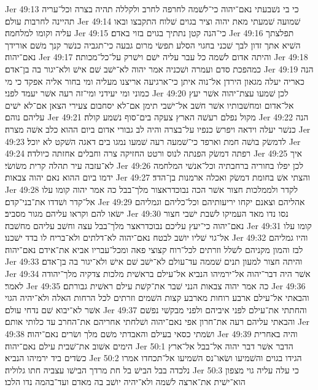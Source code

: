 Jer 49:13  כי בי נשׁבעתי נאם־יהוה כי־לשׁמה לחרפה לחרב ולקללה תהיה בצרה וכל־עריה תהיינה לחרבות עולם׃
Jer 49:14  שׁמועה שׁמעתי מאת יהוה וציר בגוים שׁלוח התקבצו ובאו עליה וקומו למלחמה׃
Jer 49:15  כי־הנה קטן נתתיך בגוים בזוי באדם׃
Jer 49:16  תפלצתך השׁיא אתך זדון לבך שׁכני בחגוי הסלע תפשׂי מרום גבעה כי־תגביה כנשׁר קנך משׁם אורידך נאם־יהוה׃
Jer 49:17  והיתה אדום לשׁמה כל עבר עליה ישׁם וישׁרק על־כל־מכותה׃
Jer 49:18  כמהפכת סדם ועמרה ושׁכניה אמר יהוה לא־ישׁב שׁם אישׁ ולא־יגור בה בן־אדם׃
Jer 49:19  הנה כאריה יעלה מגאון הירדן אל־נוה איתן כי־ארגיעה אריצנו מעליה ומי בחור אליה אפקד כי מי כמוני ומי יעידני ומי־זה רעה אשׁר יעמד לפני׃
Jer 49:20  לכן שׁמעו עצת־יהוה אשׁר יעץ אל־אדום ומחשׁבותיו אשׁר חשׁב אל־ישׁבי תימן אם־לא יסחבום צעירי הצאן אם־לא ישׁים עליהם נוהם׃
Jer 49:21  מקול נפלם רעשׁה הארץ צעקה בים־סוף נשׁמע קולה׃
Jer 49:22  הנה כנשׁר יעלה וידאה ויפרשׂ כנפיו על־בצרה והיה לב גבורי אדום ביום ההוא כלב אשׁה מצרה׃
Jer 49:23  לדמשׂק בושׁה חמת וארפד כי־שׁמעה רעה שׁמעו נמגו בים דאגה השׁקט לא יוכל׃
Jer 49:24  רפתה דמשׂק הפנתה לנוס ורטט החזיקה צרה וחבלים אחזתה כיולדה׃
Jer 49:25  איך לא־עזבה עיר תהלה קרית משׂושׂי׃
Jer 49:26  לכן יפלו בחוריה ברחבתיה וכל־אנשׁי המלחמה ידמו ביום ההוא נאם יהוה צבאות׃
Jer 49:27  והצתי אשׁ בחומת דמשׂק ואכלה ארמנות בן־הדד׃
Jer 49:28  לקדר ולממלכות חצור אשׁר הכה נבוכדראצור מלך־בבל כה אמר יהוה קומו עלו אל־קדר ושׁדדו את־בני־קדם׃
Jer 49:29  אהליהם וצאנם יקחו יריעותיהם וכל־כליהם וגמליהם ישׂאו להם וקראו עליהם מגור מסביב׃
Jer 49:30  נסו נדו מאד העמיקו לשׁבת ישׁבי חצור נאם־יהוה כי־יעץ עליכם נבוכדראצר מלך־בבל עצה וחשׁב עליהם מחשׁבה׃
Jer 49:31  קומו עלו אל־גוי שׁליו יושׁב לבטח נאם־יהוה לא־דלתים ולא־בריח לו בדד ישׁכנו׃
Jer 49:32  והיו גמליהם לבז והמון מקניהם לשׁלל וזרתים לכל־רוח קצוצי פאה ומכל־עבריו אביא את־אידם נאם־יהוה׃
Jer 49:33  והיתה חצור למעון תנים שׁממה עד־עולם לא־ישׁב שׁם אישׁ ולא־יגור בה בן־אדם׃
Jer 49:34  אשׁר היה דבר־יהוה אל־ירמיהו הנביא אל־עילם בראשׁית מלכות צדקיה מלך־יהודה לאמר׃
Jer 49:35  כה אמר יהוה צבאות הנני שׁבר את־קשׁת עילם ראשׁית גבורתם׃
Jer 49:36  והבאתי אל־עילם ארבע רוחות מארבע קצות השׁמים וזרתים לכל הרחות האלה ולא־יהיה הגוי אשׁר לא־יבוא שׁם נדחי עולם׃
Jer 49:37  והחתתי את־עילם לפני איביהם ולפני מבקשׁי נפשׁם והבאתי עליהם רעה את־חרון אפי נאם־יהוה ושׁלחתי אחריהם את־החרב עד כלותי אותם׃
Jer 49:38  ושׂמתי כסאי בעילם והאבדתי משׁם מלך ושׂרים נאם־יהוה׃
Jer 49:39  והיה באחרית הימים אשׁוב את־שׁבית עילם נאם־יהוה׃
Jer 50:1  הדבר אשׁר דבר יהוה אל־בבל אל־ארץ כשׂדים ביד ירמיהו הנביא׃
Jer 50:2  הגידו בגוים והשׁמיעו ושׂאו־נס השׁמיעו אל־תכחדו אמרו נלכדה בבל הבישׁ בל חת מרדך הבישׁו עצביה חתו גלוליה׃
Jer 50:3  כי עלה עליה גוי מצפון הוא־ישׁית את־ארצה לשׁמה ולא־יהיה יושׁב בה מאדם ועד־בהמה נדו הלכו׃
